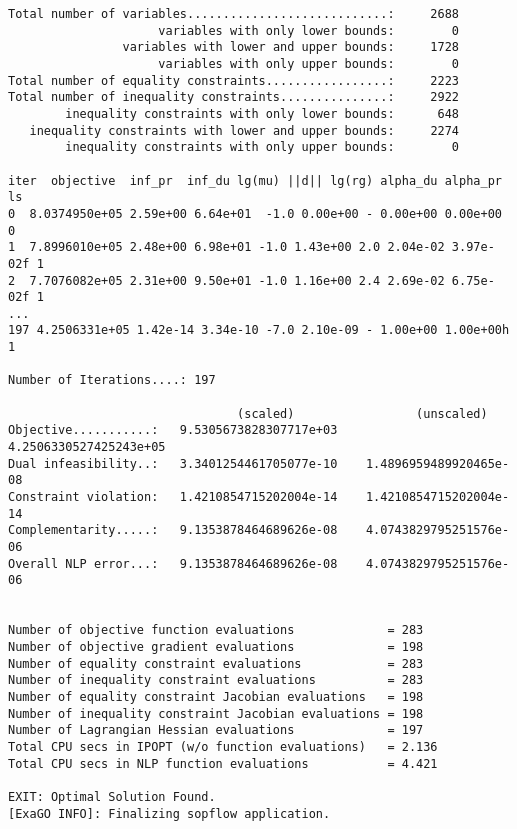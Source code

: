\begin{lstlisting}
Total number of variables............................:     2688
                     variables with only lower bounds:        0
                variables with lower and upper bounds:     1728
                     variables with only upper bounds:        0
Total number of equality constraints.................:     2223
Total number of inequality constraints...............:     2922
        inequality constraints with only lower bounds:      648
   inequality constraints with lower and upper bounds:     2274
        inequality constraints with only upper bounds:        0

iter  objective  inf_pr  inf_du lg(mu) ||d|| lg(rg) alpha_du alpha_pr  ls
0  8.0374950e+05 2.59e+00 6.64e+01  -1.0 0.00e+00 - 0.00e+00 0.00e+00   0
1  7.8996010e+05 2.48e+00 6.98e+01 -1.0 1.43e+00 2.0 2.04e-02 3.97e-02f 1
2  7.7076082e+05 2.31e+00 9.50e+01 -1.0 1.16e+00 2.4 2.69e-02 6.75e-02f 1
...
197 4.2506331e+05 1.42e-14 3.34e-10 -7.0 2.10e-09 - 1.00e+00 1.00e+00h  1

Number of Iterations....: 197

                                (scaled)                 (unscaled)
Objective...........:   9.5305673828307717e+03    4.2506330527425243e+05
Dual infeasibility..:   3.3401254461705077e-10    1.4896959489920465e-08
Constraint violation:   1.4210854715202004e-14    1.4210854715202004e-14
Complementarity.....:   9.1353878464689626e-08    4.0743829795251576e-06
Overall NLP error...:   9.1353878464689626e-08    4.0743829795251576e-06


Number of objective function evaluations             = 283
Number of objective gradient evaluations             = 198
Number of equality constraint evaluations            = 283
Number of inequality constraint evaluations          = 283
Number of equality constraint Jacobian evaluations   = 198
Number of inequality constraint Jacobian evaluations = 198
Number of Lagrangian Hessian evaluations             = 197
Total CPU secs in IPOPT (w/o function evaluations)   = 2.136
Total CPU secs in NLP function evaluations           = 4.421

EXIT: Optimal Solution Found.
[ExaGO INFO]: Finalizing sopflow application.
\end{lstlisting}

